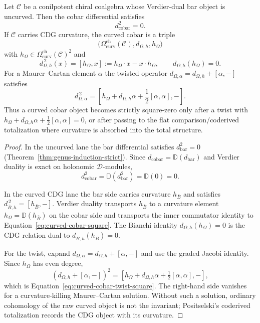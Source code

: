 \begin{corollary}\label{cor:cobar-nilpotence-verdier}
Let $\mathcal{C}$ be a conilpotent chiral coalgebra whose Verdier-dual
bar object is uncurved. Then the cobar differential satisfies
\[
d_{\mathrm{cobar}}^2 = 0.
\]
If $\mathcal{C}$ carries CDG curvature, the curved cobar is a triple
\[
\bigl(\Omega^{\mathrm{ch}}_{\mathrm{curv}}(\mathcal{C}),
  d_{\Omega,h}, h_\Omega\bigr)
\]
with $h_\Omega\in \Omega^{\mathrm{ch}}_{\mathrm{curv}}(\mathcal{C})^2$
and
\begin{equation}\label{eq:curved-cobar-square}
d_{\Omega,h}^{\,2}(x)
= [h_\Omega,x]
:= h_\Omega\cdot x - x\cdot h_\Omega,
\qquad
d_{\Omega,h}(h_\Omega)=0.
\end{equation}
For a Maurer--Cartan element $\alpha$ the twisted operator
$d_{\Omega,\alpha}=d_{\Omega,h}+[\alpha,-]$ satisfies
\begin{equation}\label{eq:curved-cobar-twist-square}
d_{\Omega,\alpha}^{\,2}
=
\left[
h_\Omega+d_{\Omega,h}\alpha+\frac{1}{2}[\alpha,\alpha],
-
\right].
\end{equation}
Thus a curved cobar object becomes strictly square-zero only after a
twist with
$h_\Omega+d_{\Omega,h}\alpha+\frac{1}{2}[\alpha,\alpha]=0$, or after
passing to the flat comparison/coderived totalization where curvature
is absorbed into the total structure.
\end{corollary}

\begin{proof}
In the uncurved lane the bar differential satisfies
$d_{\mathrm{bar}}^2 = 0$
(Theorem~\ref{thm:genus-induction-strict}). Since
$d_{\mathrm{cobar}} = \mathbb{D}(d_{\mathrm{bar}})$ and Verdier
duality is exact on holonomic $\mathcal{D}$-modules,
\[
d_{\mathrm{cobar}}^2
= \mathbb{D}(d_{\mathrm{bar}}^2)
= \mathbb{D}(0)
=0.
\]

In the curved CDG lane the bar side carries curvature $h_{\bar B}$ and
satisfies $d_{\bar B,h}^{\,2}=[h_{\bar B},-]$. Verdier duality
transports $h_{\bar B}$ to a curvature element
$h_\Omega=\mathbb{D}(h_{\bar B})$ on the cobar side and transports the
inner commutator identity to
Equation~\eqref{eq:curved-cobar-square}. The Bianchi identity
$d_{\Omega,h}(h_\Omega)=0$ is the CDG relation dual to
$d_{\bar B,h}(h_{\bar B})=0$.

For the twist, expand
$d_{\Omega,\alpha}=d_{\Omega,h}+[\alpha,-]$ and use the graded Jacobi
identity. Since $h_\Omega$ has even degree,
\[
(d_{\Omega,h}+[\alpha,-])^2
=[h_\Omega+d_{\Omega,h}\alpha+\tfrac12[\alpha,\alpha],-],
\]
which is Equation~\eqref{eq:curved-cobar-twist-square}. The right-hand
side vanishes for a curvature-killing Maurer--Cartan solution. Without
such a solution, ordinary cohomology of the raw curved object is not
the invariant; Positselski's coderived totalization records the CDG
object with its curvature.
\end{proof}

